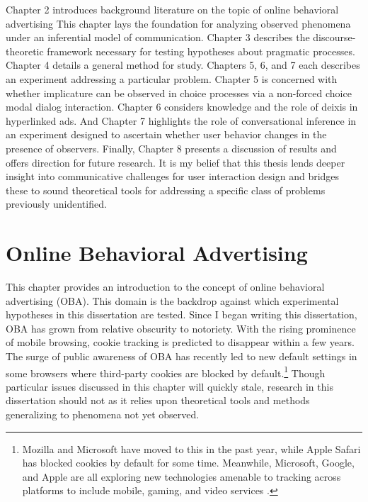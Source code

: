 Chapter 2 introduces background literature on the topic of online behavioral advertising This chapter lays the foundation for analyzing observed phenomena under an inferential model of communication. Chapter 3 describes the discourse-theoretic framework necessary for testing hypotheses about pragmatic processes. Chapter 4 details a general method for study. Chapters 5, 6, and 7 each describes an experiment addressing a particular problem. Chapter 5 is concerned with whether implicature can be observed in choice processes via a non-forced choice modal dialog interaction. Chapter 6 considers knowledge and the role of deixis in hyperlinked ads. And Chapter 7 highlights the role of conversational inference in an experiment designed to ascertain whether user behavior changes in the presence of observers. Finally, Chapter 8 presents a discussion of results and offers direction for future research. It is my belief that this thesis lends deeper insight into communicative challenges for user interaction design and bridges these to sound theoretical tools for addressing a specific class of problems previously unidentified.

\chapter{Online Behavioral Advertising}
\label{onlinebehavioraladvertising}

This chapter provides an introduction to the concept of online behavioral advertising (OBA). This domain is the backdrop against which experimental hypotheses in this dissertation are tested. Since I began writing this dissertation, OBA has grown from relative obscurity to notoriety. With the rising prominence of mobile browsing, cookie tracking is predicted to disappear within a few years. The surge of public awareness of OBA has recently led to new default settings in some browsers where third-party cookies are blocked by  default.\footnote{Mozilla and Microsoft have moved to this in the past year, while Apple Safari has blocked cookies by default for some time. Meanwhile, Microsoft, Google, and Apple are all exploring new technologies amenable to tracking across platforms to include mobile, gaming, and video services \citep{DOrazio:2013tx}.}  Though particular issues discussed in this chapter will quickly stale, research in this dissertation should not as it relies upon theoretical tools and methods generalizing to phenomena not yet observed. 

